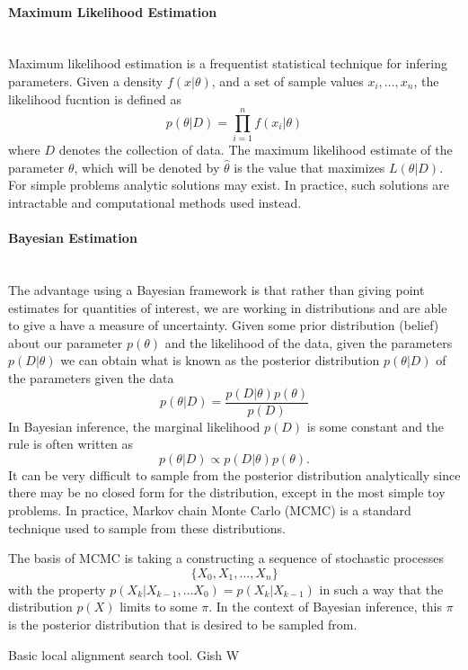 \paragraph{Maximum Likelihood Estimation} ~\\
\noindent Maximum likelihood estimation is a frequentist statistical technique for infering parameters. Given a density $f(x|\theta)$, and a set of sample values $x_i,\ldots,x_n$, the likelihood fucntion is defined as  
	\begin{equation}
		p(\theta|D) = \prod_{i=1}^{n}f(x_i|\theta)
	\end{equation}
where $D$ denotes the collection of data. The maximum likelihood estimate of the parameter $\theta$, which will be denoted by $\hat{\theta}$ is the value that maximizes $L(\theta|D)$. For simple problems analytic solutions may exist. In practice, such solutions are intractable and computational methods used instead.

\paragraph{Bayesian Estimation}~\\
\noindent The advantage using a Bayesian framework is that rather than giving point estimates for quantities of interest, we are working in distributions and are able to give a have a measure of uncertainty. Given some prior distribution (belief) about our parameter $p(\theta)$ and the likelihood of the data, given the parameters $p(D|\theta)$ we can obtain what is known as the posterior distribution $ p(\theta|D)$ of the parameters given the data 
    \begin{equation}
        p(\theta|D) = \frac{p(D|\theta)p(\theta)}{p(D)}
    \end{equation}
In Bayesian inference, the marginal likelihood $p(D)$ is some constant and the rule is often written as 
    \begin{equation}
        p(\theta|D) \propto p(D|\theta)p(\theta).
    \end{equation}
It can be very difficult to sample from the posterior distribution analytically since there may be no closed form for the distribution, except in the most simple toy problems. In practice, Markov chain Monte Carlo (MCMC) is a standard technique used to sample from these distributions. 

The basis of MCMC is taking a constructing a sequence of stochastic processes $$\{X_0,X_1,\ldots,X_n\}$$ with the property $p(X_k|X_{k-1},\ldots X_0) = p(X_k|X_{k-1})$ in such a way that the distribution $p(X)$ limits to some $\pi$. In the context of Bayesian inference, this $\pi$ is the posterior distribution that is desired to be sampled from.

Basic local alignment search tool.
Gish W